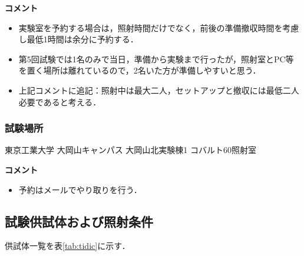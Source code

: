 \vspace{3ex} 
\textbf{コメント}
\begin{itemize}
\item 実験室を予約する場合は，照射時間だけでなく，前後の準備撤収時間を考慮し最低1時間は余分に予約する．
\item 第5回試験では1名のみで当日，準備から実験まで行ったが，照射室とPC等を置く場所は離れているので，2名いた方が準備しやすいと思う．
\item 上記コメントに追記：照射中は最大二人，セットアップと撤収には最低二人必要であると考える．
\end{itemize}
	
\subsubsection{試験場所}
東京工業大学 大岡山キャンパス 大岡山北実験棟1 コバルト60照射室

\vspace{3ex} 
\textbf{コメント}
\begin{itemize}
	\item 予約はメールでやり取りを行う．
\end{itemize}


\subsection{試験供試体および照射条件}

供試体一覧を表\ref{tab:tidic}に示す．


